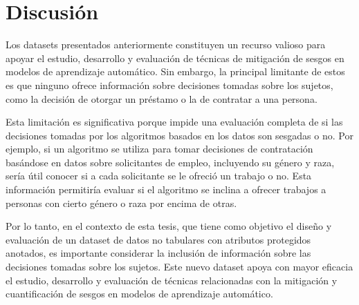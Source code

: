 \section{Discusi\'on}

Los datasets presentados anteriormente constituyen un recurso valioso para apoyar el estudio, desarrollo y evaluaci\'on de t\'ecnicas de 
mitigaci\'on de sesgos en modelos de aprendizaje autom\'atico. Sin embargo, la principal limitante de estos es que ninguno ofrece 
informaci\'on sobre decisiones tomadas sobre los sujetos, como la decisi\'on de otorgar un pr\'estamo o la de contratar a una persona.

Esta limitaci\'on es significativa porque impide una evaluaci\'on completa de si las decisiones tomadas por los algoritmos basados 
en los datos son sesgadas o no. Por ejemplo, si un algoritmo se utiliza para tomar decisiones de contrataci\'on bas\'andose en datos
sobre solicitantes de empleo, incluyendo su g\'enero y raza, ser\'ia \'util conocer si a cada solicitante se le ofreci\'o 
un trabajo o no. Esta informaci\'on permitir\'ia evaluar si el algoritmo se inclina a ofrecer trabajos a personas con cierto g\'enero o raza
por encima de otras.

Por lo tanto, en el contexto de esta tesis, que tiene como objetivo el dise\~no y evaluaci\'on de un dataset de datos no tabulares
con atributos protegidos anotados, es importante considerar la inclusi\'on de informaci\'on sobre las decisiones tomadas sobre los sujetos.
Este nuevo dataset apoya con mayor eficacia el estudio, desarrollo y evaluaci\'on de t\'ecnicas relacionadas con la mitigaci\'on y 
cuantificaci\'on de sesgos en modelos de aprendizaje autom\'atico.


